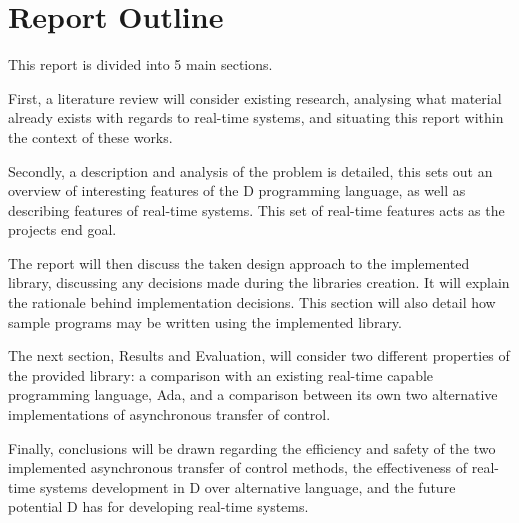 \section{Report Outline} %
This report is divided into 5 main sections.
\par\bigskip\noindent 
First, a literature review will 
consider existing research, analysing what material already exists with regards 
to real-time systems, and situating this report within the context of these works. 
\par\bigskip\noindent 
Secondly, a description and analysis of the problem is detailed, this sets out      %
an overview of interesting features of the D programming language, as well as 
describing features of real-time systems. This set of real-time features acts as 
the projects end goal. 
\par\bigskip\noindent 
The report will then discuss the taken design approach to the implemented library,
discussing any decisions made during the libraries creation. It will explain the 
rationale behind implementation decisions. This section will also detail 
how sample programs may be written using the implemented library. 
\par\bigskip\noindent 
The next section, Results and Evaluation, will consider two different properties 
of the provided library: a comparison with an existing real-time capable programming 
language, Ada, and a comparison between its own two alternative implementations 
of asynchronous transfer of control. 
\par\bigskip\noindent 
Finally, conclusions will be drawn regarding the efficiency and safety of the 
two implemented asynchronous transfer of control methods, the effectiveness of 
real-time systems development in D over alternative language, and the future 
potential D has for developing real-time systems.
